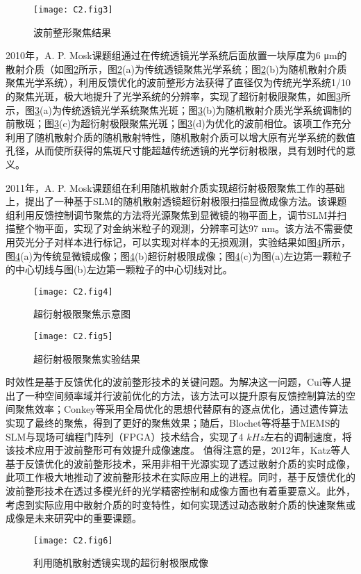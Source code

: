 \begin{figure}[htp]
	\centering
	\texttt{[image: C2.fig3]}
	\caption{波前整形聚焦结果\cite{Vellekoop2007}}
	\label{fig2:3}
\end{figure}

2010年，A. P. Mosk\cite{vellekoop_exploiting_2010}课题组通过在传统透镜光学系统后面放置一块厚度为6 μm的散射介质（如图\ref{fig2:4}所示，图\ref{fig2:4}(a)为传统透镜聚焦光学系统；图\ref{fig2:4}(b)为随机散射介质聚焦光学系统），利用反馈优化的波前整形方法获得了直径仅为传统光学系统1/10的聚焦光斑，极大地提升了光学系统的分辨率，实现了超衍射极限聚焦，如图\ref{fig2:5}所示，图\ref{fig2:5}(a)为传统透镜光学系统聚焦光斑；图\ref{fig2:5}(b)为随机散射介质光学系统调制的前散斑；图\ref{fig2:5}(c)为超衍射极限聚焦光斑；图\ref{fig2:5}(d)为优化的波前相位。该项工作充分利用了随机散射介质的随机散射特性，随机散射介质可以增大原有光学系统的数值孔径，从而使所获得的焦斑尺寸能超越传统透镜的光学衍射极限，具有划时代的意义。

2011年，A. P. Mosk\cite{van_putten_scattering_2011}课题组在利用随机散射介质实现超衍射极限聚焦工作的基础上，提出了一种基于SLM的随机散射透镜超衍射极限扫描显微成像方法。该课题组利用反馈控制调节聚焦的方法将光源聚焦到显微镜的物平面上，调节SLM并扫描整个物平面，实现了对金纳米粒子的观测，分辨率可达97 nm。该方法不需要使用荧光分子对样本进行标记，可以实现对样本的无损观测，实验结果如图\ref{fig2:6}所示，图\ref{fig2:6}(a)为传统显微镜成像；图\ref{fig2:6}(b)超衍射极限成像；图\ref{fig2:6}(c)为图(a)左边第一颗粒子的中心切线与图(b)左边第一颗粒子的中心切线对比。

\begin{figure}[htp]
	\centering
	\texttt{[image: C2.fig4]}
	\caption{超衍射极限聚焦示意图\cite{vellekoop_exploiting_2010}}
	\label{fig2:4}
\end{figure}

\begin{figure}[htp]
	\centering
	\texttt{[image: C2.fig5]}
	\caption{超衍射极限聚焦实验结果\cite{vellekoop_exploiting_2010}}
	\label{fig2:5}
\end{figure}

时效性是基于反馈优化的波前整形技术的关键问题。为解决这一问题，Cui等人\cite{cui_parallel_2011}提出了一种空间频率域并行波前优化的方法，该方法可以提升原有反馈控制算法的空间聚焦效率；Conkey等\cite{conkey_color_2012}采用全局优化的思想代替原有的逐点优化，通过遗传算法实现了最终的聚焦，得到了更好的聚焦效果；随后，Blochet等\cite{blochet_fast_2017}将基于MEMS的SLM与现场可编程门阵列（FPGA）技术结合，实现了4 $kHz$左右的调制速度，将该技术应用于波前整形可有效提升成像速度。
值得注意的是，2012年，Katz等人\cite{katz_looking_2012}基于反馈优化的波前整形技术，采用非相干光源实现了透过散射介质的实时成像，此项工作极大地推动了波前整形技术在实际应用上的进程。同时，基于反馈优化的波前整形技术在透过多模光纤的光学精密控制和成像方面也有着重要意义\cite{park_perspective_2018,lemoult_manipulating_2009,lerosey_focusing_2007}。此外，考虑到实际应用中散射介质的时变特性，如何实现透过动态散射介质的快速聚焦或成像是未来研究中的重要课题。
\begin{figure}[htp]
	\centering
	\texttt{[image: C2.fig6]}
	\caption{利用随机散射透镜实现的超衍射极限成像\cite{van_putten_scattering_2011}}
	\label{fig2:6}
\end{figure}


